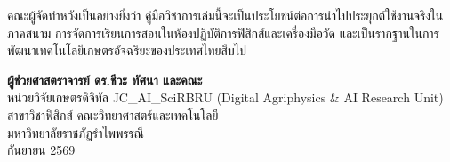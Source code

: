 คณะผู้จัดทำหวังเป็นอย่างยิ่งว่า คู่มือวิชาการเล่มนี้จะเป็นประโยชน์ต่อการนำไปประยุกต์ใช้งานจริงในภาคสนาม การจัดการเรียนการสอนในห้องปฏิบัติการฟิสิกส์และเครื่องมือวัด และเป็นรากฐานในการพัฒนาเทคโนโลยีเกษตรอัจฉริยะของประเทศไทยสืบไป

\vspace{1.0cm}
\begin{flushright}
    \begin{minipage}{0.65\textwidth}
        \centering
        \textbf{ผู้ช่วยศาสตราจารย์ ดร.ชีวะ ทัศนา และคณะ}\\
        หน่วยวิจัยเกษตรดิจิทัล JC\_AI\_SciRBRU (Digital Agriphysics \& AI Research Unit)\\
        สาขาวิชาฟิสิกส์ คณะวิทยาศาสตร์และเทคโนโลยี\\
        มหาวิทยาลัยราชภัฏรำไพพรรณี\\
        กันยายน 2569
    \end{minipage}
\end{flushright}
